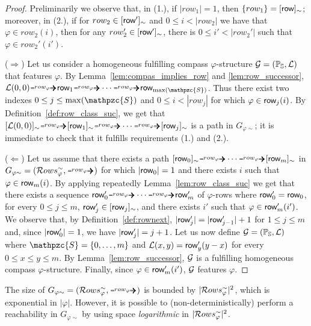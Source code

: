 \begin{proof}
Preliminarily we observe that, in (1.), if $|row_1|=1$, then $\{row_1\}=[\text{{\sffamily row}}]_\sim$; moreover, in (2.), if for $row_2\in[\text{{\sffamily row}}']_\sim$ and $0\leq i<|row_2|$ we have that $\varphi\in row_2(i)$, then for any $row_2'\in[\text{{\sffamily row}}']_\sim$, there is $0\leq i'<|row_2'|$ such that $\varphi\in row_2'(i')$.

($\Rightarrow$) 
Let us consider a homogeneous fulfilling compass $\varphi$-structure $\mathcal{G}=(\mathbb{P}_{\mathbb{S}}, \mathcal{L})$ that features $\varphi$.
By Lemma~\ref{lem:compas_implies_row} and \ref{lem:row_successor}, 
$\cL(0,0) \rownext \allowbreak  \row_1 \rownext \cdots\linebreak \rownext \row_{\max(\mathpzc{S})}$. Thus
there exist two indexes $0\leq j\leq \max(\mathpzc{S})$ and $0\leq i<|row_j|$ for which $\varphi \in \text{{\sffamily row}}_j(i)$. 
By Definition~\ref{def:row_class_suc}, we get that $[\cL(0,0)]_\sim \rownext \allowbreak  [\row_1]_\sim \rownext \cdots \rownext [\row_{j}]_\sim$ is a path in $G_{\varphi \sim}$; it is immediate to check that it fulfills requirements (1.) and (2.).

($\Leftarrow$) Let us assume that there exists a path $[\row_0]_\sim 
\rownext \cdots \rownext [\row_{m}]_\sim$ in $G_{\varphi\sim}=\allowbreak (\Rows^\sim, \rownext)$
for which $|\text{{\sffamily row}}_0| = 1$ and there exists $i$ such that $\varphi\in \text{{\sffamily row}}_m(i)$. 
By applying repeatedly Lemma~\ref{lem:row_class_suc}
we get that there exists a sequence 
$\row'_0 \rownext \cdots \rownext \row'_{m}$ of $\varphi$-rows where $\text{{\sffamily row}}'_0 =\text{{\sffamily row}}_0$,
for every $0\leq j\leq m$, $\text{{\sffamily row}}'_j\in [\text{{\sffamily row}}_j]_\sim$,
and there exists $i'$ such that $\varphi\in \text{{\sffamily row}}_m'(i')$.
%
We observe that, by Definition~\ref{def:rownext},
$|\text{{\sffamily row}}_j'|=|\text{{\sffamily row}}_{j-1}'|+1$
 for $1\leq j \leq m$
and, since $|\text{{\sffamily row}}'_0|=1$, we have $|\text{{\sffamily row}}_{j}'|= j + 1$. 
%
Let us now define $\mathcal{G}=(\mathbb{P}_{\mathbb{S}}, \mathcal{L})$ where $\mathpzc{S}= \{0,\ldots, m\}$ and
$\mathcal{L}(x,y)=\text{{\sffamily row}}_y'(y-x)$ for every $0\leq x\leq y\leq m$.
By Lemma~\ref{lem:row_successor}, $\mathcal{G}$ is a fulfilling homogeneous compass $\varphi$-structure.
Finally, since $\varphi\in \text{{\sffamily row}}_m'(i')$, $\mathcal{G}$ features $\varphi$.
\end{proof}

The size of $G_{\varphi\sim}=(\Rows^\sim,\rownext)$ is bounded by $|\mathcal{R} ows_{\varphi}^\sim|^2$, which is exponential 
in $|\varphi|$. However, 
it is possible to (non-deterministically) perform a reachability in $G_{\varphi \sim}$ by using space \emph{logarithmic} in $|\mathcal{R} ows_{\varphi}^\sim|^2$.


